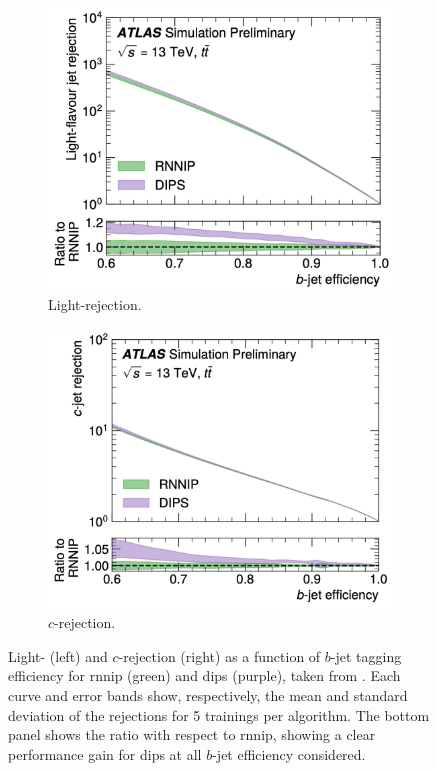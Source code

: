 \begin{figure}[h!]
  \centering
  \begin{subfigure}[b]{0.48\textwidth}
      \centering
      \includegraphics[scale=0.4]{Images/FTAG/dipsrnnipL.png}
      \caption{Light-rejection.} 
      \label{fig:dipsrnnipPerfL}
  \end{subfigure}
  \hfill
  \begin{subfigure}[b]{0.48\textwidth}
      \centering
      \includegraphics[scale=0.4]{Images/FTAG/dipsrnnipC.png}
      \caption{$c$-rejection.} 
      \label{fig:dipsrnnipPerfC}
  \end{subfigure}
  \caption{Light- (left) and $c$-rejection (right) as a function of $b$-jet tagging efficiency for \gls{rnnip} (green) and \gls{dips} (purple), taken from \cite{ATL-PHYS-PUB-2020-014}. Each curve and error bands show, respectively, the mean and standard deviation of the rejections for 5 trainings per algorithm. The bottom panel shows the ratio with respect to \gls{rnnip}, showing a clear performance gain for \gls{dips} at all $b$-jet efficiency considered.}
  \label{fig:dipsrnnipPerf}
\end{figure} 

